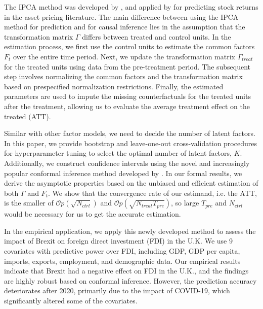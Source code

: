 \documentclass[12pt]{article}
\begin{document}
The IPCA method was developed by \cite{kelly2020instrumented}, and applied by \cite{kelly2019characteristics} for predicting stock returns in the asset pricing literature. The main difference between using the IPCA method for prediction and for causal inference lies in the assumption that the transformation matrix $\Gamma$ differs between treated and control units. In the estimation process, we first use the control units to estimate the common factors $F_t$ over the entire time period. Next, we update the transformation matrix $\Gamma_{treat}$ for the treated units using data from the pre-treatment period. The subsequent step involves normalizing the common factors and the transformation matrix based on prespecified normalization restrictions. Finally, the estimated parameters are used to impute the missing counterfactuals for the treated units after the treatment, allowing us to evaluate the average treatment effect on the treated (ATT).

Similar with other factor models, we need to decide the number of latent factors. In this paper, we provide bootstrap and leave-one-out cross-validation procedures for hyperparameter tuning to select the optimal number of latent factors, $K$. Additionally, we construct confidence intervals using the novel and increasingly popular conformal inference method developed by \cite{chernozhukov2021exact}. In our formal results, we derive the asymptotic properties based on the unbiased and efficient estimation of both $\Gamma$ and $F_t$. We show that the convergence rate of our estimand, i.e. the ATT, is the smaller of $\mathcal{O}p(\sqrt{N_{ctrl}})$ and $\mathcal{O}p(\sqrt{N_{treat}T_{pre}})$, so large $T_{pre}$ and $N_{ctrl}$ would be necessary for us to get the accurate estimation.

In the empirical application, we apply this newly developed method to assess the impact of Brexit on foreign direct investment (FDI) in the U.K. We use 9 covariates with predictive power over FDI, including GDP, GDP per capita, imports, exports, employment, and demographic data. Our empirical results indicate that Brexit had a negative effect on FDI in the U.K., and the findings are highly robust based on conformal inference. However, the prediction accuracy deteriorates after 2020, primarily due to the impact of COVID-19, which significantly altered some of the covariates.

\end{document}
